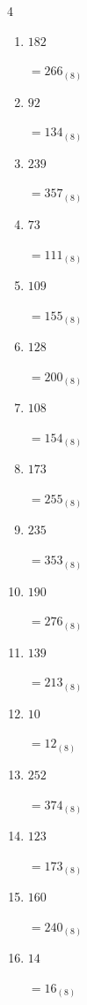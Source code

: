 \begin{multicols}{4}
\begin{enumerate}
        $=112_{(8)}$

  \item $182$

        $=266_{(8)}$

  \item $92$

        $=134_{(8)}$

  \item $239$

        $=357_{(8)}$

  \item $73$

        $=111_{(8)}$

  \item $109$

        $=155_{(8)}$

\columnbreak %

  \item $128$

        $=200_{(8)}$

  \item $108$

        $=154_{(8)}$

  \item $173$

        $=255_{(8)}$

  \item $235$

        $=353_{(8)}$

  \item $190$

        $=276_{(8)}$

  \item $139$

        $=213_{(8)}$

  \item $10$

        $=12_{(8)}$

  \item $252$

        $=374_{(8)}$

  \item $123$

        $=173_{(8)}$

  \item $160$

        $=240_{(8)}$

  \item $14$

        $=16_{(8)}$


\end{enumerate}
\end{multicols}
